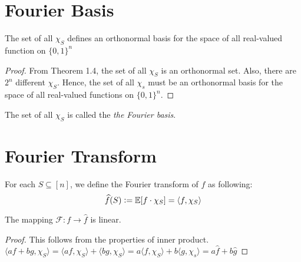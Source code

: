 \section{Fourier Basis}
\begin{theorem}
The set of all $\chi_S$ defines an orthonormal basis for the space of all real-valued function on $\{ 0, 1\}^n$
\end{theorem}

\begin{proof}
From Theorem 1.4, the set of all $\chi_S$ is an orthonormal set. Also, there are $2^n$ different $\chi_S$. Hence, the set of all $\chi_s$ must be an orthonormal basis for the space of all real-valued functions on $\{ 0,1 \}^n$.
\end{proof}
The set of all $\chi_S$ is called the \textit{the Fourier basis}.

\section{Fourier Transform}
\begin{definition} 
For each $S \subseteq [n]$, we define the Fourier transform of $f$ as following: 
 $$\widehat{f}(S) \vcentcolon= \mathbb{E}[f \cdot \chi_S] = \langle f, \chi_S \rangle $$
\end{definition}

\begin{theorem}
The mapping $\mathcal{F} : f \rightarrow \widehat{f}$ is linear.
\end{theorem}

\begin{proof}
This follows from the properties of inner product. \center
$\langle af + bg, \chi_S \rangle = 
 \langle af, \chi_S \rangle + \langle bg, \chi_S \rangle = 
 a\langle f, \chi_S \rangle + b \langle g, \chi_s \rangle =
 a \widehat{f} + b \widehat{g} $
\end{proof}

